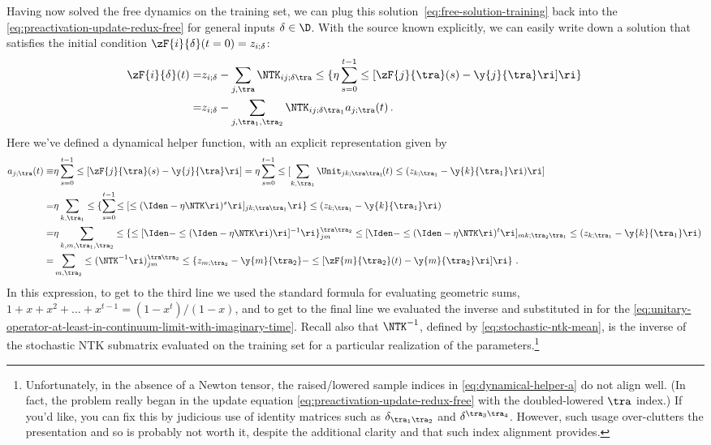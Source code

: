Having now solved the free dynamics on the training set, we can plug this solution~\eqref{eq:free-solution-training} back into the  \eqref{eq:preactivation-update-redux-free} for general inputs $\delta \in \D$. With the source known explicitly, we can easily write down a solution that satisfies the initial condition $\zF{i}{\delta}(t=0)=z_{i;\delta}$:
\begin{align}\label{eq:free-solution-general}
\zF{i}{\delta}(t)=&z_{i;\delta}-\sum_{j,\tra}\NTK_{ij;\delta\tra}\le\{\eta\sum_{s=0}^{t-1}\le[\zF{j}{\tra}(s)-\y{j}{\tra}\ri]\ri\}\, \\
=&z_{i;\delta}-\sum_{j,\tra_1,\tra_2}\NTK_{ij;\delta\tra_1}a_{j;\tra}(t)\, .\notag
\end{align}
Here we've defined a dynamical helper function, with an explicit representation given by
\begin{align}\label{eq:dynamical-helper-a}
a_{j;\tra}(t)\equiv&\eta\sum_{s=0}^{t-1}\le[\zF{j}{\tra}(s)-\y{j}{\tra}\ri]=\eta\sum_{s=0}^{t-1}\le[\sum_{k,\tra_1}\Unit_{jk;\tra\tra_1}\!(t)\le(z_{k;\tra_1}-\y{k}{\tra_1}\ri)\ri] \, \\
=&\eta\sum_{k,\tra_1} \le\{ \sum_{s=0}^{t-1}\!\le[ \le(\Iden-\eta\NTK\ri)^{s}\ri]_{j k;\tra\tra_1}\ri\}\le(z_{k;\tra_1}-\y{k}{\tra_1}\ri)\, \notag\\
=&\eta\sum_{k,m,\tra_1,\tra_2}\le\{\le[\Iden-\le(\Iden-\eta\NTK\ri)\ri]^{-1}\ri\}_{jm}^{\tra\tra_2}\le[\Iden-\le(\Iden-\eta\NTK\ri)^t\ri]_{mk;\tra_2\tra_1}\le(z_{k;\tra_1}-\y{k}{\tra_1}\ri)\, \notag\\
=&\sum_{m,\tra_2}\le(\NTK^{-1}\ri)_{jm}^{\tra\tra_2}\le\{z_{m;\tra_2}-\y{m}{\tra_2}-\le[\zF{m}{\tra_2}(t)-\y{m}{\tra_2}\ri]\ri\}\,\notag \, .
\end{align}
In this expression, to get to the third line we used the standard formula for evaluating geometric sums, $1+x+ x^2 + \dots + x^{t-1} = (1-x^t)/(1-x)$, and to get to the final line we evaluated the inverse and substituted in for the  \eqref{eq:unitary-operator-at-least-in-continuum-limit-with-imaginary-time}. Recall also that $\NTK^{-1}$,  defined by 
\eqref{eq:stochastic-ntk-mean}, 
is the inverse of the stochastic NTK submatrix evaluated on the training set for a particular realization of the parameters.\footnote{Unfortunately, in the absence of a Newton tensor, the raised/lowered sample indices in \eqref{eq:dynamical-helper-a} do not align well. (In fact, the problem really began in the update equation \eqref{eq:preactivation-update-redux-free} with the doubled-lowered $\tra$ index.) If you'd like, you can fix this by judicious use of identity matrices such as $\delta_{\tra_1 \tra_2}$ and $\delta^{\tra_3 \tra_4}$.
However, such usage over-clutters the presentation and so is probably not worth it, despite the additional clarity and  that such index alignment provides.
}




